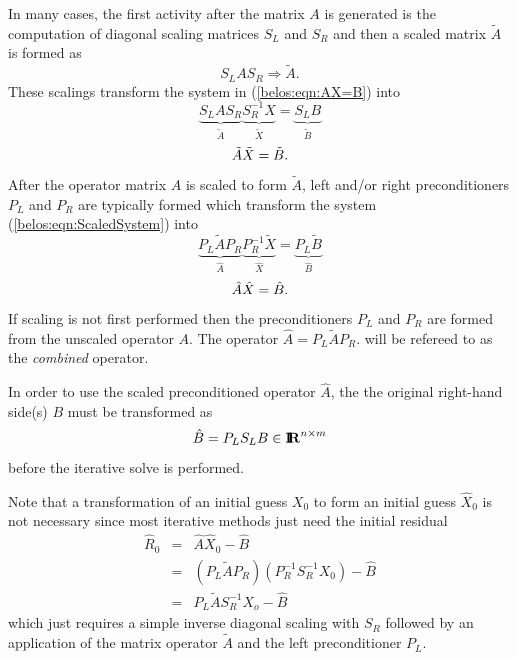 \documentclass[pdf,ps2pdf,11pt]{SANDreport}
\begin{document}
In many cases, the first activity after the matrix $A$ is generated is
the computation of diagonal scaling matrices $S_L$ and $S_R$ and then
a scaled matrix $\tilde{A}$ is formed as
%
\begin{equation}
S_L A S_R \Rightarrow \tilde{A}.
\label{belos:eqn:A_tilde}
\end{equation}
%
These scalings transform the system in ({}\ref{belos:eqn:AX=B}) into
%
\[
\underbrace{S_L A S_R}_{\displaystyle{\tilde{A}}}
\underbrace{S_R^{-1} X}_{\displaystyle{\tilde{X}}}
=
\underbrace{S_L B}_{\displaystyle{\tilde{B}}}
\]
%
\begin{equation}
\nonumber \\
\tilde{A} \tilde{X}  = \tilde{B}.
\label{belos:eqn:ScaledSystem}
\end{equation}
%
After the operator matrix $A$ is scaled to form $\tilde{A}$, left
and/or right preconditioners $P_L$ and $P_R$ are typically formed
which transform the system ({}\ref{belos:eqn:ScaledSystem}) into
%
\[
\underbrace{P_L \tilde{A} P_R}_{\displaystyle{\hat{A}}}
\underbrace{P_R^{-1} \tilde{X}}_{\displaystyle{\hat{X}}}
=
\underbrace{P_L \tilde{B}}_{\displaystyle{\hat{B}}}
\]
%
\begin{equation}
\nonumber \\
\hat{A} \hat{X}  = \hat{B}.
\label{belos:eqn:PreconditionedSystem}
\end{equation}
%
If scaling is not first performed then the preconditioners $P_L$ and
$P_R$ are formed from the unscaled operator $A$.  The operator
$\hat{A} = P_L \tilde{A} P_R$.  will be refereed to as the
{}\textit{combined} operator.

In order to use the scaled preconditioned operator $\hat{A}$, the the
original right-hand side(s) $B$ must be transformed as
%
\begin{equation}
\hat{B} = P_L S_L B \in \mbox{\textbf{I}}\hspace{-0.6ex}\mbox{\textbf{R}}^{n \times m}
\label{B-preprocess}
\end{equation}
%
{}\noindent{}before the iterative solve is performed.

Note that a transformation of an initial guess $X_0$ to form an
initial guess $\hat{X}_0$ is not necessary since most iterative
methods just need the initial residual
%
\begin{eqnarray}
\hat{R}_0
& = & \hat{A} \hat{X}_0 - \hat{B}
\nonumber \\
& = & \left( P_L \tilde{A} P_R \right) \left( P_R^{-1} S_R^{-1} X_0 \right) - \hat{B}
\nonumber \\
& = & P_L \tilde{A} S_R^{-1} X_o - \hat{B}
\label{belos:eqn:R_hat_0}
\end{eqnarray}
%
{}\noindent{}which just requires a simple inverse diagonal scaling
with $S_R$ followed by an application of the matrix operator
$\tilde{A}$ and the left preconditioner $P_L$.
\end{document}

